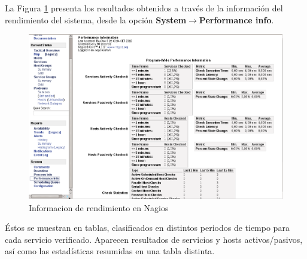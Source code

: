 La Figura \ref{fig:figura138} presenta los resultados obtenidos a través de la información del rendimiento del sistema, desde la opción \textbf{System}$ \rightarrow $\textbf{Performance info}.

\begin{figure}[H]
	\centering
	\includegraphics[scale=0.6]{figuras/ejercicio12/figura19.png} 
	\caption{Informacion de rendimiento en Nagios} 
	\label{fig:figura138}
\end{figure}

Éstos se muestran en tablas, clasificados en distintos periodos de tiempo para cada servicio verificado. Aparecen resultados de servicios y hosts activos/pasivos, así como las estadísticas resumidas en una tabla distinta.

\newpage




